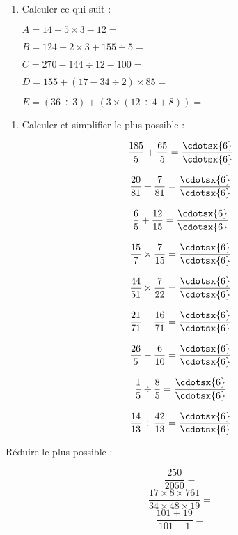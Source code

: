 \documentclass[a4paper,12pt]{article}
\begin{document}
\devoir[prv=true, ds=true,num=1 ,niv=1 , date=03/11/2022 ]
\begin{exo}[10]
\begin{enumerate}
\item Calculer ce qui suit :
\begin{multicols}{2}		
$ A=14+5\times 3-12=$\anserline[3]

$ B=124+2\times 3+155\div 5=$\anserline[3]

$ C=270-144\div 12-100=$\anserline[3]
\columnbreak

$ D=155+(17-34\div 2)\times 85=$\anserline[4]

$ E=(36\div 3)+(3\times(12\div 4+8))=$\anserline[5]
\end{multicols}
\end{enumerate}	
\end{exo}

\begin{exo}[5]
	\begin{enumerate}
		\item Calculer et simplifier le plus possible :
		\end{enumerate}
\begin{multicols}{3}		

\[\dfrac{185}{5}+\dfrac{65}{5}=\dfrac{\cdotsx{6}}{\cdotsx{6}}\]

\[\dfrac{20}{81}+\dfrac{7}{81}=\dfrac{\cdotsx{6}}{\cdotsx{6}}\]

\[\dfrac{6}{5}+\dfrac{12}{15}=\dfrac{\cdotsx{6}}{\cdotsx{6}}\]

\[\dfrac{15}{7}\times \dfrac{7}{15}=\dfrac{\cdotsx{6}}{\cdotsx{6}}\]

\[\dfrac{44}{51}\times\dfrac{7}{22}=\dfrac{\cdotsx{6}}{\cdotsx{6}}\]

\[\dfrac{21}{71}-\dfrac{16}{71}=\dfrac{\cdotsx{6}}{\cdotsx{6}}\]

\[\dfrac{26}{5}-\dfrac{6}{10}=\dfrac{\cdotsx{6}}{\cdotsx{6}}\]

\[\dfrac{1}{5}\div\dfrac{8}{5}=\dfrac{\cdotsx{6}}{\cdotsx{6}}\]

\[\dfrac{14}{13}\div\dfrac{42}{13}=\dfrac{\cdotsx{6}}{\cdotsx{6}}\]
\end{multicols}	
\vspace{1cm}	
\end{exo}
\newpage
\begin{exo}[3]
 Réduire le plus possible :
		
$$\dfrac{250}{2050}=$$
$$\dfrac{17\times 8\times 761}{34\times 48 \times 19}=$$
$$\dfrac{101+19}{101-1}=$$

\end{exo}
\end{document}

